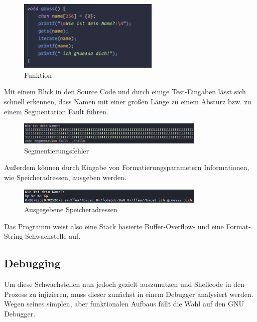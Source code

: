 \begin{figure}[h]
    \centering
    \includegraphics[width=0.6\textwidth,height=0.75\textheight,keepaspectratio]{images/gruss.png}
    \caption{Funktion }
\end{figure}
Mit einem Blick in den Source Code und durch einige Test-Eingaben lässt sich schnell erkennen,
dass Namen mit einer großen Länge zu einem Absturz bzw. zu einem Segmentation Fault führen.

\begin{figure}[h]
    \centering
    \includegraphics[width=0.8\textwidth,height=0.75\textheight,keepaspectratio]{images/segfault.png}
    \caption{Segmentierungsfehler}
\end{figure}

Außerdem können durch Eingabe von Formatierungsparametern Informationen, wie Speicheradressen, ausgeben werden.

\begin{figure}[h]
    \centering
    \includegraphics[width=0.8\textwidth,height=0.75\textheight,keepaspectratio]{images/adressen.png}
    \caption{Ausgegebene Speicheradressen}
\end{figure}

Das Programm weist also eine Stack basierte Buffer-Overflow- und eine Format-String-Schwachstelle auf. \cite{protostar}

\subsection{Debugging}

Um diese Schwachstellen nun jedoch gezielt auszunutzen und Shellcode in den Prozess zu injizieren,
muss dieser zunächst in einem Debugger analysiert werden. Wegen seines simplen, aber funktionalen Aufbaus
fällt die Wahl auf den GNU Debugger.

